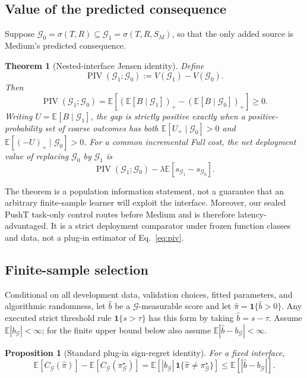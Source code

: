 \documentclass[10pt]{article}
\newtheorem{theorem}{Theorem}
\newtheorem{proposition}{Proposition}
\theoremstyle{definition}
\theoremstyle{remark}
\newcommand{\E}{\mathbb{E}}
\newcommand{\G}{\mathcal{G}}
\newcommand{\pos}[1]{\left(#1\right)_{+}}
\newcommand{\pusht}{PushT}
\begin{document}
\subsection{Value of the predicted consequence}

Suppose $\G_0=\sigma(T,R)\subseteq\G_1=\sigma(T,R,S_M)$, so that the only
added source is Medium's predicted consequence.

\begin{theorem}[Nested-interface Jensen identity]
\label{thm:piv}
Define
\[
 \operatorname{PIV}(\G_1;\G_0)
 :=V(\G_1)-V(\G_0).
\]
Then
\begin{equation}
 \operatorname{PIV}(\G_1;\G_0)
 =
 \E\!\left[
   \pos{\E[B\mid\G_1]}-\pos{\E[B\mid\G_0]}
 \right]\geq0.
 \label{eq:piv}
\end{equation}
Writing $U=\E[B\mid\G_1]$, the gap is strictly positive exactly when a
positive-probability set of coarse outcomes has both
$\E[U_+\mid\G_0]>0$ and $\E[(-U)_+\mid\G_0]>0$.  For a common incremental Full cost, the net deployment value of
replacing $\G_0$ by $\G_1$ is
\[
 \operatorname{PIV}(\G_1;\G_0)
 -\lambda\E[s_{\G_1}-s_{\G_0}].
\]
\end{theorem}

The theorem is a population information statement, not a guarantee that an
arbitrary finite-sample learner will exploit the interface.  Moreover, our
sealed \pusht{} task-only control routes before Medium and is therefore
latency-advantaged.  It is a strict deployment comparator under frozen
function classes and data, not a plug-in estimator of
Eq.~\eqref{eq:piv}.

\subsection{Finite-sample selection}

Conditional on all development data, validation choices, fitted parameters,
and algorithmic randomness, let $\widehat b$ be a $\G$-measurable score and
let $\widehat\pi=\mathbf{1}\{\widehat b>0\}$.  Any executed strict
threshold rule $\mathbf 1\{s>\tau\}$ has this form by taking
$\widehat b=s-\tau$.  Assume $\E|b_{\G}|<\infty$; for the finite upper bound below also assume
$\E|\widehat b-b_{\G}|<\infty$.

\begin{proposition}[Standard plug-in sign-regret identity]
\label{prop:plugin}
For a fixed interface,
\begin{equation}
  \E[C_{\G}(\widehat\pi)]
  -\E[C_{\G}(\pi^\star_{\G})]
  =
  \E\!\left[
    |b_{\G}|\,
    \mathbf{1}\{\widehat\pi\neq\pi^\star_{\G}\}
  \right]
  \leq \E[|\widehat b-b_{\G}|].
  \label{eq:plugin}
\end{equation}
\end{proposition}
\end{document}
